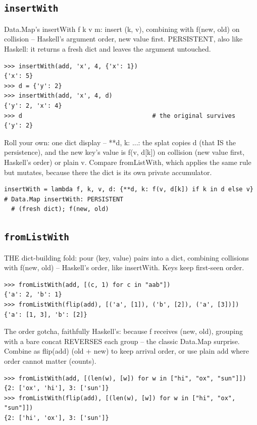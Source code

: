\documentclass[10pt,letterpaper]{book}
\begin{document}
\subsection{\texttt{insertWith}}\label{def:insertWith}
Data.Map's insertWith f k v m: insert (k, v), combining with f(new, old) on collision -- Haskell's argument order, new value first. PERSISTENT, also like Haskell: it returns a fresh dict and leaves the argument untouched.
\begin{lstlisting}[style=ex]
>>> insertWith(add, 'x', 4, {'x': 1})
{'x': 5}
>>> d = {'y': 2}
>>> insertWith(add, 'x', 4, d)
{'y': 2, 'x': 4}
>>> d                                    # the original survives
{'y': 2}
\end{lstlisting}

Roll your own: one dict display -- {**d, k: ...}: the splat copies d (that IS the persistence), and the new key's value is f(v, d[k]) on collision (new value first, Haskell's order) or plain v. Compare fromListWith, which applies the same rule but mutates, because there the dict is its own private accumulator.

\begin{lstlisting}[style=ex]
insertWith = lambda f, k, v, d: {**d, k: f(v, d[k]) if k in d else v}  # Data.Map insertWith: PERSISTENT
  # (fresh dict); f(new, old)
\end{lstlisting}
\subsection{\texttt{fromListWith}}\label{def:fromListWith}
THE dict-building fold: pour (key, value) pairs into a dict, combining collisions with f(new, old) -- Haskell's order, like insertWith. Keys keep first-seen order.
\begin{lstlisting}[style=ex]
>>> fromListWith(add, [(c, 1) for c in "aab"])
{'a': 2, 'b': 1}
>>> fromListWith(flip(add), [('a', [1]), ('b', [2]), ('a', [3])])
{'a': [1, 3], 'b': [2]}
\end{lstlisting}

The order gotcha, faithfully Haskell's: because f receives (new, old), grouping with a bare concat REVERSES each group -- the classic Data.Map surprise. Combine as flip(add) (old + new) to keep arrival order, or use plain add where order cannot matter (counts).

\begin{lstlisting}[style=ex]
>>> fromListWith(add, [(len(w), [w]) for w in ["hi", "ox", "sun"]])
{2: ['ox', 'hi'], 3: ['sun']}
>>> fromListWith(flip(add), [(len(w), [w]) for w in ["hi", "ox", "sun"]])
{2: ['hi', 'ox'], 3: ['sun']}
\end{lstlisting}
\end{document}
